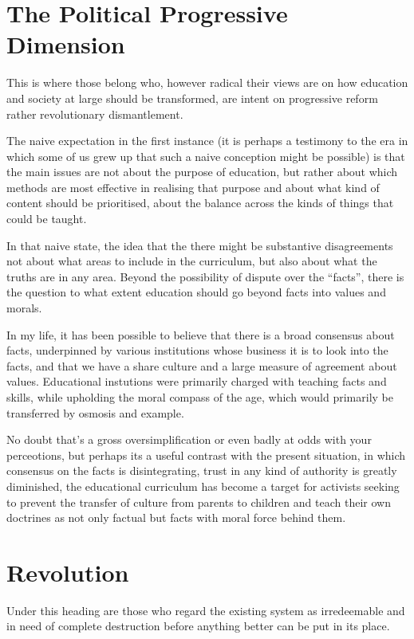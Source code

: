 \documentclass[10pt,titlepage]{article}
\begin{document}
\section{The Political Progressive Dimension}

This is where those belong who, however radical their views are on how education and society at large should be transformed, are intent on progressive reform rather revolutionary dismantlement.

The naive expectation in the first instance (it is perhaps a testimony to the era in which some of us grew up that such a naive conception might be possible) is that the main issues are not about the purpose of education, but rather about which methods are most effective in realising that purpose and about what kind of content should be prioritised, about the balance across the kinds of things that could be taught.

In that naive state, the idea that the there might be substantive disagreements not about what areas to include in the curriculum, but also about what the truths are in any area.
Beyond the possibility of dispute over the ``facts'', there is the question to what extent education should go beyond facts into values and morals.

In my life, it has been possible to believe that there is a broad consensus about facts, underpinned by various institutions whose business it is to look into the facts, and that we have a share culture and a large measure of agreement about values.
Educational instutions were primarily charged with teaching facts and skills, while upholding the moral compass of the age, which would primarily be transferred by osmosis and example.

No doubt that's a gross oversimplification or even badly at odds with your perceotions, but perhaps its a useful contrast with the present situation, in which consensus on the facts is disintegrating, trust in any kind of authority is greatly diminished, the educational curriculum has become a target for activists seeking to prevent the transfer of culture from parents to children and teach their own doctrines as not only factual but facts with moral force behind them.

\section{Revolution}

Under this heading are those who regard the existing system as irredeemable and in need of complete destruction before anything better can be put in its place.
\end{document}

